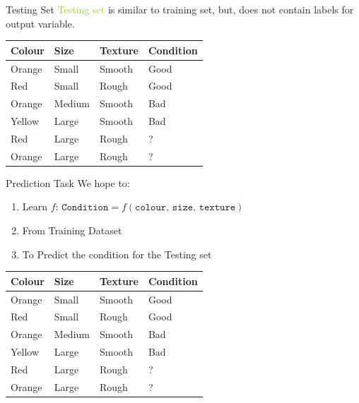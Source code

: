 \documentclass[usenames,dvipsnames]{beamer}
\begin{document}
\begin{frame}{Testing Set}
\textcolor{YellowGreen}{Testing set} is similar to \textcolor{Peach}{training set}, but, does not contain labels for output variable. 

\begin{table}[]
	\begin{tabular}{|l|l|l||l|}
		\hline 
		\textbf{Colour} & \textbf{Size} & \textbf{Texture} & \textbf{Condition} \\ \hline 
		\rowcolor{Peach}
		Orange & Small & Smooth  & Good      \\
		\rowcolor{Peach}
		Red    & Small  & Rough  & Good \\
		\rowcolor{Peach}
		Orange & Medium & Smooth & Bad \\
		\rowcolor{Peach}
		Yellow & Large  & Smooth & Bad \\ \hline
				\rowcolor{YellowGreen}
		Red    & Large  & Rough  & ? \\
		\rowcolor{YellowGreen}
		Orange &  Large & Rough  & ? \\ \hline          
	\end{tabular}
\end{table}
\end{frame}



\begin{frame}{Prediction Task}
We hope to:
\begin{enumerate}
	\item \pause Learn $f$: 		$\texttt{Condition} = f(\texttt{colour, size, texture})$
	\item \pause From Training Dataset
	\item \pause To Predict the condition for the Testing set
\end{enumerate}


\begin{table}[]
	\begin{tabular}{|l|l|l||l|}
		\hline 
		
		\textbf{Colour} & \textbf{Size} & \textbf{Texture} & \textbf{Condition} \\ \hline 
		Orange & Small & Smooth  & Good      \\
		Red    & Small  & Rough  & Good \\
		Orange & Medium & Smooth & Bad \\
		Yellow & Large  & Smooth & Bad \\ \hline
		Red    & Large  & Rough  & ? \\
		Orange &  Large & Rough  & ? \\ \hline          
	\end{tabular}
\end{table}
\end{frame}
\end{document}
